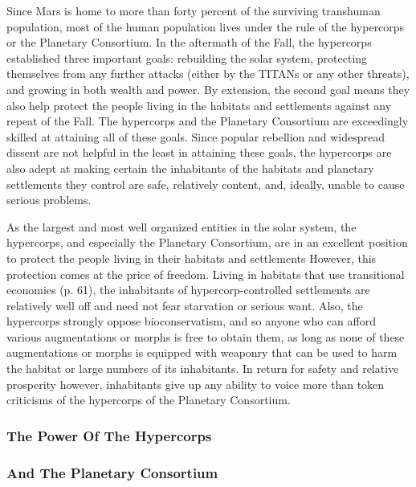 Since Mars is home to more than forty percent of 
the surviving transhuman population, most of the 
human population lives under the rule of the hypercorps
or the Planetary Consortium. In the aftermath
of the Fall, the hypercorps established three important 
goals: rebuilding the solar system, protecting themselves
from any further attacks (either by the TITANs
or any other threats), and growing in both wealth 
and power. By extension, the second goal means they 
also help protect the people living in the habitats and 
settlements against any repeat of the Fall. The hypercorps
and the Planetary Consortium are exceedingly
skilled at attaining all of these goals. Since popular 
rebellion and widespread dissent are not helpful in 
the least in attaining these goals, the hypercorps are 
also adept at making certain the inhabitants of the 
habitats and planetary settlements they control are 
safe, relatively content, and, ideally, unable to cause 
serious problems.

As the largest and most well organized entities in 
the solar system, the hypercorps, and especially the 
Planetary Consortium, are in an excellent position to 
protect the people living in their habitats and settlements
However, this protection comes at the price
of freedom. Living in habitats that use transitional 
economies (p. 61), the inhabitants of hypercorp-controlled
settlements are relatively well off and need not
fear starvation or serious want. Also, the hypercorps 
strongly oppose bioconservatism, and so anyone who 
can afford various augmentations or morphs is free 
to obtain them, as long as none of these augmentations
or morphs is equipped with weaponry that can
be used to harm the habitat or large numbers of its 
inhabitants. In return for safety and relative prosperity
however, inhabitants give up any ability to voice
more than token criticisms of the hypercorps of the 
Planetary Consortium.

\subsubsection{The Power Of The Hypercorps}


\subsubsection{And The Planetary Consortium}

